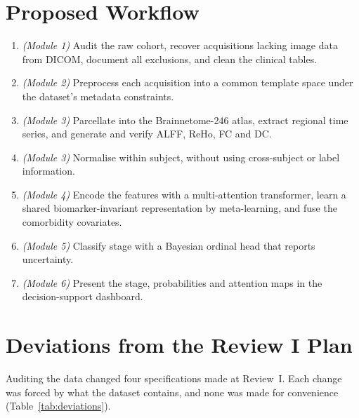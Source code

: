\documentclass{ssnreview}
\begin{document}
\section{Proposed Workflow}
\begin{enumerate}[label=\textbf{Step \arabic*:}]
  \item \emph{(Module 1)} Audit the raw cohort, recover acquisitions lacking image
        data from DICOM, document all exclusions, and clean the clinical tables.
  \item \emph{(Module 2)} Preprocess each acquisition into a common template space
        under the dataset's metadata constraints.
  \item \emph{(Module 3)} Parcellate into the Brainnetome-246 atlas, extract regional
        time series, and generate and verify ALFF, ReHo, FC and DC.
  \item \emph{(Module 3)} Normalise within subject, without using cross-subject or
        label information.
  \item \emph{(Module 4)} Encode the features with a multi-attention transformer, learn
        a shared biomarker-invariant representation by meta-learning, and fuse the
        comorbidity covariates.
  \item \emph{(Module 5)} Classify stage with a Bayesian ordinal head that reports
        uncertainty.
  \item \emph{(Module 6)} Present the stage, probabilities and attention maps in the
        decision-support dashboard.
\end{enumerate}

\section{Deviations from the Review I Plan}\label{sec:deviations}

Auditing the data changed four specifications made at Review~I. Each change was
forced by what the dataset contains, and none was made for convenience
(Table~\ref{tab:deviations}).
\end{document}
